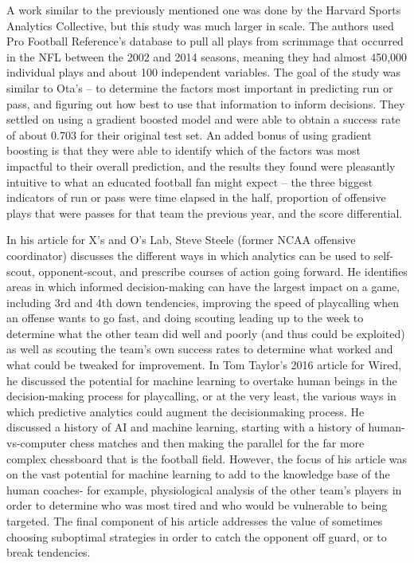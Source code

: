 \documentclass{article}
\begin{document}
	A work similar to the previously mentioned one was done by the Harvard Sports Analytics Collective, but this study was much larger in scale. The authors used Pro Football Reference’s database to pull all plays from scrimmage that occurred in the NFL between the 2002 and 2014 seasons, meaning they had almost 450,000 individual plays and about 100 independent variables. The goal of the study was similar to Ota’s – to determine the factors most important in predicting run or pass, and figuring out how best to use that information to inform decisions. They settled on using a gradient boosted model and were able to obtain a success rate of about 0.703 for their original test set. An added bonus of using gradient boosting is that they were able to identify which of the factors was most impactful to their overall prediction, and the results they found were pleasantly intuitive to what an educated football fan might expect – the three biggest indicators of run or pass were time elapsed in the half, proportion of offensive plays that were passes for that team the previous year, and the score differential.
	
	In his article for X’s and O’s Lab, Steve Steele (former NCAA offensive coordinator) discusses the different ways in which analytics can be used to self-scout, opponent-scout, and prescribe courses of action going forward. He identifies areas in which informed decision-making can have the largest impact on a game, including 3rd and 4th down tendencies, improving the speed of playcalling when an offense wants to go fast, and doing scouting leading up to the week to determine what the other team did well and poorly (and thus could be exploited) as well as scouting the team’s own success rates to determine what worked and what could be tweaked for improvement. 
	In Tom Taylor’s 2016 article for Wired, he discussed the potential for machine learning to overtake human beings in the decision-making process for playcalling, or at the very least, the various ways in which predictive analytics could augment the decisionmaking process. He discussed a history of AI and machine learning, starting with a history of human-vs-computer chess matches and then making the parallel for the far more complex chessboard that is the football field. However, the focus of his article was on the vast potential for machine learning to add to the knowledge base of the human coaches- for example, physiological analysis of the other team’s players in order to determine who was most tired and who would be vulnerable to being targeted. The final component of his article addresses the value of sometimes choosing suboptimal strategies in order to catch the opponent off guard, or to break tendencies. 
	
\end{document}
